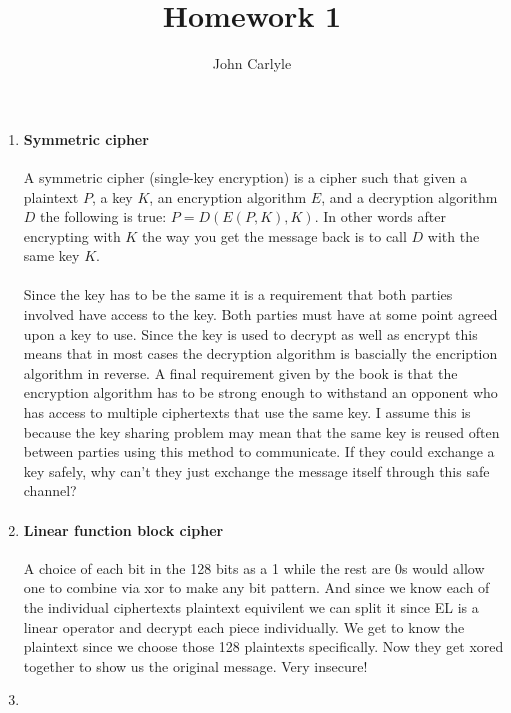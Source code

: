 \documentclass{article}
\title{Homework 1}
\author{John Carlyle}
\begin{document}
\maketitle

\begin{enumerate}
\item \hfill
  \paragraph{Symmetric cipher}{A symmetric cipher (single-key encryption) is a cipher such that given a plaintext $P$, a key $K$, an encryption algorithm $E$, and a decryption algorithm $D$ the following is true: $P = D(E(P,K),K)$. In other words after encrypting with $K$ the way you get the message back is to call $D$ with the same key $K$.}
  \paragraph{}{Since the key has to be the same it is a requirement that both parties involved have access to the key. Both parties must have at some point agreed upon a key to use. Since the key is used to decrypt as well as encrypt this means that in most cases the decryption algorithm is bascially the encription algorithm in reverse. A final requirement given by the book is that the encryption algorithm has to be strong enough to withstand an opponent who has access to multiple ciphertexts that use the same key. I assume this is because the key sharing problem may mean that the same key is reused often between parties using this method to communicate. If they could exchange a key safely, why can't they just exchange the message itself through this safe channel?}
\item \hfill
  \paragraph{Linear function block cipher}{A choice of each bit in the 128 bits as a 1 while the rest are 0s would allow one to combine via xor to make any bit pattern. And since we know each of the individual ciphertexts plaintext equivilent we can split it since EL is a linear operator and decrypt each piece individually. We get to know the plaintext since we choose those 128 plaintexts specifically. Now they get xored together to show us the original message. Very insecure!}
\item \hfill 

\end{enumerate}
\end{document}
